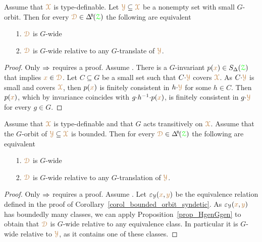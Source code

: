 \begin{proposition}\label{prop_HgenGgen}
  Assume that ${\color{brown}\EuScript X}$ is type-definable.
  Let ${\color{brown}\EuScript Y}\subseteq{\color{brown}\EuScript X}$ be a nonempty set with small $G$-orbit.
  Then for every $\mrD\in\BDelta(\grZ)$ the following are equivalent
  \begin{itemize}
    \item [1.] ${\color{brown}\EuScript D}$ is $G$-wide
    \item [2.] ${\color{brown}\EuScript D}$ is $G$-wide relative to any $G$-translate of ${\color{brown}\EuScript Y}$.
  \end{itemize}\smallskip
\end{proposition}

\begin{proof}
  Only $\Rightarrow$ requires a proof.
  Assume .
  There is a $G$-invariant $p({\color{brown} x})\in S_\Delta({\color{green}\EuScript Z})$ that implies ${\color{brown} x}\in{\color{brown}\EuScript D}$.
  Let $C\subseteq G$ be a small set such that $C{\cdot}{\color{brown}\EuScript Y}$ covers ${\color{brown}\EuScript X}$.
  As $C{\cdot}{\color{brown}\EuScript Y}$ is small and covers ${\color{brown}\EuScript X}$, then $p({\color{brown} x})$ is finitely consistent in $h{\cdot}{\color{brown}\EuScript Y}$ for some $h\in C$.
  Then $p({\color{brown} x})$, which by invariance coincides with $g{\cdot}h^{-1}{\cdot}p({\color{brown} x})$, is finitely consistent in $g{\cdot}{\color{brown}\EuScript Y}$ for every $g\in G$.
\end{proof}

\begin{corollary}
  Assume that ${\color{brown}\EuScript X}$ is type-definable and that $G$ acts transitively on ${\color{brown}\EuScript X}$.
  Assume that the $G$-orbit of ${\color{brown}\EuScript Y}\subseteq{\color{brown}\EuScript X}$ is bounded.
  Then for every $\mrD\in\BDelta(\grZ)$ the following are equivalent
  \begin{itemize}
    \item [1.] ${\color{brown}\EuScript D}$ is $G$-wide
    \item [2.] ${\color{brown}\EuScript D}$ is $G$-wide relative to any $G$-translation of ${\color{brown}\EuScript Y}$.
  \end{itemize}\smallskip
\end{corollary}

\begin{proof}
  Only $\Rightarrow$ requires a proof.
  Assume .
  Let $\varepsilon_\EuScript Y({\color{brown} x},{\color{brown} y})$ be the equivalence relation defined in the proof of Corollary~\ref{corol_bounded_orbit_syndetic}.
  As $\varepsilon_\EuScript Y({\color{brown} x},{\color{brown} y})$ has boundedly many classes, we can apply Proposition~\ref{prop_HgenGgen} to obtain that ${\color{brown}\EuScript D}$ is $G$-wide relative to any equivalence class.
  In particular it is $G$-wide relative to ${\color{brown}\EuScript Y}$, as it contains one of these classes.
\end{proof}

